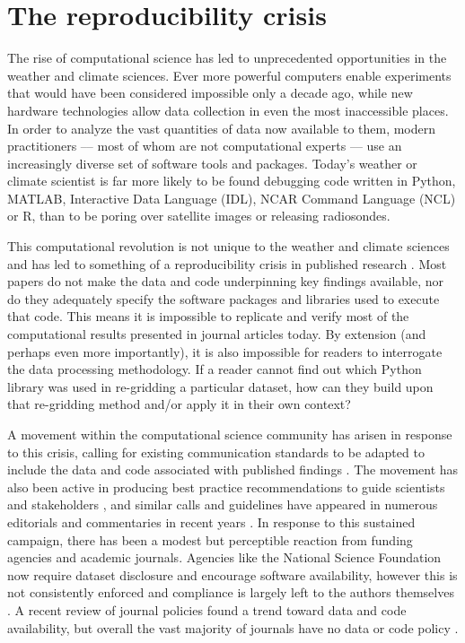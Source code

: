 \section{The reproducibility crisis}

The rise of computational science has led to unprecedented opportunities in the weather and climate sciences. Ever more powerful computers enable experiments that would have been considered impossible only a decade ago, while new hardware technologies allow data collection in even the most inaccessible places. In order to analyze the vast quantities of data now available to them, modern practitioners –-- most of whom are not computational experts –-- use an increasingly diverse set of software tools and packages. Today's weather or climate scientist is far more likely to be found debugging code written in Python, MATLAB, Interactive Data Language (IDL), NCAR Command Language (NCL) or R, than to be poring over satellite images or releasing radiosondes. 

This computational revolution is not unique to the weather and climate sciences and has led to something of a reproducibility crisis in published research \citep[e.g.][]{Peng2011}. Most papers do not make the data and code underpinning key findings available, nor do they adequately specify the software packages and libraries used to execute that code. This means it is impossible to replicate and verify most of the computational results presented in journal articles today. By extension (and perhaps even more importantly), it is also impossible for readers to interrogate the data processing methodology. If a reader cannot find out which Python library was used in re-gridding a particular dataset, how can they build upon that re-gridding method and/or apply it in their own context? 

A movement within the computational science community has arisen in response to this crisis, calling for existing communication standards to be adapted to include the data and code associated with published findings \citep[e.g.][]{Stodden2014}. The movement has also been active in producing best practice recommendations to guide scientists and stakeholders \citep[e.g.][]{Prlic2012,Stodden2012a,Sandve2013,Stodden2014}, and similar calls and guidelines have appeared in numerous editorials and commentaries in recent years \citep[e.g.][]{Barnes2010,Merali2010,Ince2012}. In response to this sustained campaign, there has been a modest but perceptible reaction from funding agencies and academic journals. Agencies like the National Science Foundation now require dataset disclosure and encourage software availability, however this is not consistently enforced and compliance is largely left to the authors themselves \citep{Stodden2013}. A recent review of journal policies found a trend toward data and code availability, but overall the vast majority of journals have no data or code policy \citep{Stodden2013}. 

